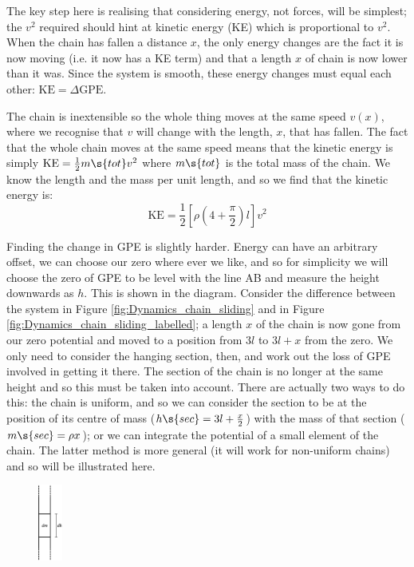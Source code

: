 \begin{problem}
{\begin{enumerate}
The key step here is realising that considering energy, not forces, will be simplest; the $v^{2}$ required should hint at kinetic energy (KE) which is proportional to $v^{2}$. When the chain has fallen a distance $x$, the only energy changes are the fact it is now moving (i.e. it now has a KE term) and that a length $x$ of chain is now lower than it was. Since the system is smooth, these energy changes must equal each other: $\textrm{KE} = \Delta \textrm{GPE}$.

The chain is inextensible so the whole thing moves at the same speed $v(x)$, where we recognise that $v$ will change with the length, $x$, that has fallen. The fact that the whole chain moves at the same speed means that the kinetic energy is simply $\textrm{KE} = \frac{1}{2}m\s{tot}v^{2}$ where $m\s{tot}$ is the total mass of the chain. We know the length and the mass per unit length, and so we find that the kinetic energy is:
	\begin{equation*} \textrm{KE} = \frac{1}{2}\left[\rho\left(4 + \frac{\pi}{2}\right)l\right]v^{2} \end{equation*}

Finding the change in GPE is slightly harder. Energy can have an arbitrary offset, we can choose our zero where ever we like, and so for simplicity we will choose the zero of GPE to be level with the line AB and measure the height downwards as $h$. This is shown in the diagram. Consider the difference between the system in Figure \ref{fig:Dynamics_chain_sliding} and in Figure \ref{fig:Dynamics_chain_sliding_labelled}; a length $x$ of the chain is now gone from our zero potential and moved to a position from $3l$ to $3l + x$ from the zero. We only need to consider the hanging section, then, and work out the loss of GPE involved in getting it there. The section of the chain is no longer at the same height and so this must be taken into account. There are actually two ways to do this: the chain is uniform, and so we can consider the section to be at the position of its centre of mass ($h\s{sec} = 3l + \frac{x}{2}$) with the mass of that section ($m\s{sec} = \rho x$); or we can integrate the potential of a small element of the chain. The latter method is more general (it will work for non-uniform chains) and so will be illustrated here.

\begin{figure}[h]
\centering
\includegraphics[width=0.07\textwidth]{../../../figures/Dynamics_chain_element.svg}
\caption{}
\label{fig:Dynamics_chain_element}
\end{figure}


\end{enumerate}}
\end{problem}
